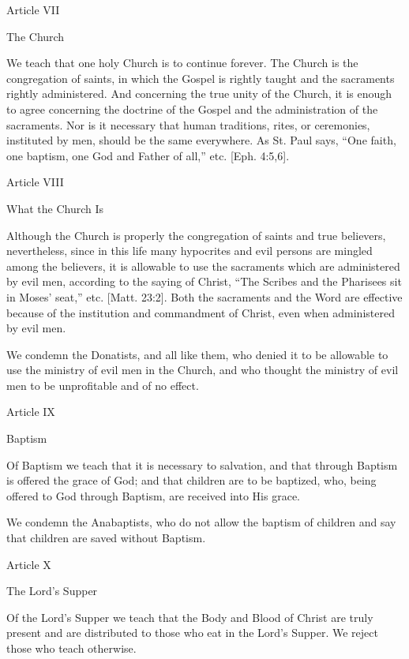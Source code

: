  

Article VII

The Church

We teach that one holy Church is to continue forever. The Church is the congregation of saints, in which the Gospel is rightly taught and the sacraments rightly administered. And concerning the true unity of the Church, it is enough to agree concerning the doctrine of the Gospel and the administration of the sacraments. Nor is it necessary that human traditions, rites, or ceremonies, instituted by men, should be the same everywhere. As St. Paul says, “One faith, one baptism, one God and Father of all,” etc. [Eph. 4:5,6].

 

Article VIII

What the Church Is

Although the Church is properly the congregation of saints and true believers, nevertheless, since in this life many hypocrites and evil persons are mingled among the believers, it is allowable to use the sacraments which are administered by evil men, according to the saying of Christ, “The Scribes and the Pharisees sit in Moses’ seat,” etc. [Matt. 23:2]. Both the sacraments and the Word are effective because of the institution and commandment of Christ, even when administered by evil men.

We condemn the Donatists, and all like them, who denied it to be allowable to use the ministry of evil men in the Church, and who thought the ministry of evil men to be unprofitable and of no effect.

 

Article IX

Baptism

Of Baptism we teach that it is necessary to salvation, and that through Baptism is offered the grace of God; and that children are to be baptized, who, being offered to God through Baptism, are received into His grace.

We condemn the Anabaptists, who do not allow the baptism of children and say that children are saved without Baptism.

 

Article X

The Lord’s Supper

Of the Lord’s Supper we teach that the Body and Blood of Christ are truly present and are distributed to those who eat in the Lord’s Supper. We reject those who teach otherwise.

 

